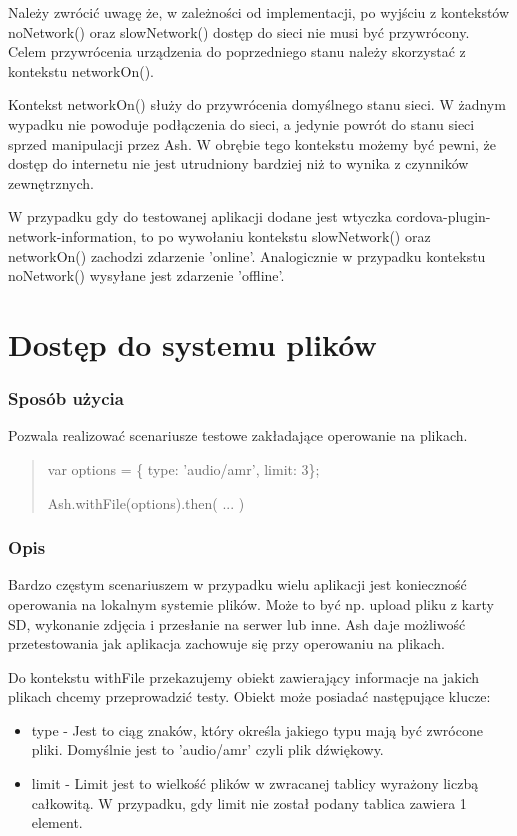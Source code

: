 \documentclass[brudnopis]{xmgr}
\begin{document}
Należy zwrócić uwagę że, w zależności od implementacji, po wyjściu z kontekstów noNetwork() oraz slowNetwork() dostęp do sieci nie musi być przywrócony. Celem przywrócenia urządzenia do poprzedniego stanu należy skorzystać z kontekstu networkOn(). 

Kontekst networkOn() służy do przywrócenia domyślnego stanu sieci. W żadnym wypadku nie powoduje podłączenia do sieci, a jedynie powrót do stanu sieci sprzed manipulacji przez Ash. W obrębie tego kontekstu możemy być pewni, że dostęp do internetu nie jest utrudniony bardziej niż to wynika z czynników zewnętrznych. 

W przypadku gdy do testowanej aplikacji dodane jest wtyczka cordova-plugin-network-information,  to po wywołaniu kontekstu slowNetwork() oraz networkOn() zachodzi zdarzenie 'online'. Analogicznie w przypadku kontekstu noNetwork() wysyłane jest zdarzenie 'offline'. 

\section{Dostęp do systemu plików}

\subsubsection{Sposób użycia}
Pozwala realizować scenariusze testowe zakładające operowanie na plikach.

\begin{quote}
var options = \{ type: 'audio/amr', limit: 3\};

Ash.withFile(options).then( ... )
\end{quote}

\subsubsection{Opis}

Bardzo częstym scenariuszem w przypadku wielu aplikacji jest konieczność operowania na lokalnym systemie plików. Może to być np. upload pliku z karty SD, wykonanie zdjęcia i przesłanie na serwer lub inne. Ash daje możliwość przetestowania jak aplikacja zachowuje się przy operowaniu na plikach.  

Do kontekstu withFile przekazujemy obiekt zawierający informacje na jakich plikach chcemy przeprowadzić testy. Obiekt może posiadać następujące klucze:

\begin{itemize}
  \item type - Jest to ciąg znaków, który określa jakiego typu mają być zwrócone pliki. Domyślnie jest to 'audio/amr' czyli plik dźwiękowy. 
  \item limit - Limit jest to wielkość plików w zwracanej tablicy wyrażony liczbą całkowitą. W przypadku, gdy limit nie został podany tablica zawiera 1 element. 
\end{itemize}
\end{document}
